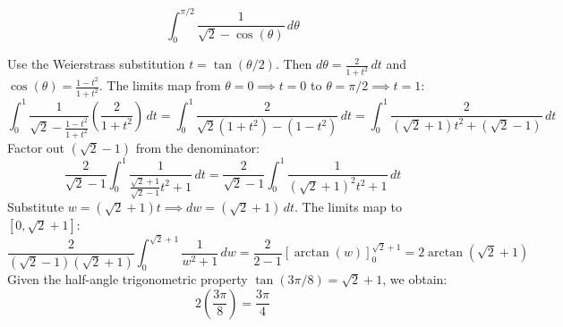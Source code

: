 \begin{questions}
    \question \[ \int_{0}^{\pi/2}\frac{1}{\sqrt{2}-\cos(\theta)} \,d\theta \]
    \begin{solution}
        Use the Weierstrass substitution $t = \tan(\theta/2)$. Then $d\theta = \frac{2}{1+t^2} \,dt$ and $\cos(\theta) = \frac{1-t^2}{1+t^2}$. The limits map from $\theta = 0 \implies t = 0$ to $\theta = \pi/2 \implies t = 1$:
        \[ \int_{0}^{1} \frac{1}{\sqrt{2} - \frac{1-t^2}{1+t^2}} \left( \frac{2}{1+t^2} \right) \,dt = \int_{0}^{1} \frac{2}{\sqrt{2}(1+t^2) - (1-t^2)} \,dt = \int_{0}^{1} \frac{2}{(\sqrt{2}+1)t^2 + (\sqrt{2}-1)} \,dt \]
        Factor out $(\sqrt{2}-1)$ from the denominator:
        \[ \frac{2}{\sqrt{2}-1} \int_{0}^{1} \frac{1}{\frac{\sqrt{2}+1}{\sqrt{2}-1}t^2 + 1} \,dt = \frac{2}{\sqrt{2}-1} \int_{0}^{1} \frac{1}{(\sqrt{2}+1)^2 t^2 + 1} \,dt \]
        Substitute $w = (\sqrt{2}+1)t \implies dw = (\sqrt{2}+1) \,dt$. The limits map to $[0, \sqrt{2}+1]$:
        \[ \frac{2}{(\sqrt{2}-1)(\sqrt{2}+1)} \int_{0}^{\sqrt{2}+1} \frac{1}{w^2 + 1} \,dw = \frac{2}{2 - 1} \left[ \arctan(w) \right]_0^{\sqrt{2}+1} = 2\arctan(\sqrt{2}+1) \]
        Given the half-angle trigonometric property $\tan(3\pi/8) = \sqrt{2}+1$, we obtain:
        \[ 2 \left( \frac{3\pi}{8} \right) = \frac{3\pi}{4} \]
    \end{solution}
\end{questions}


